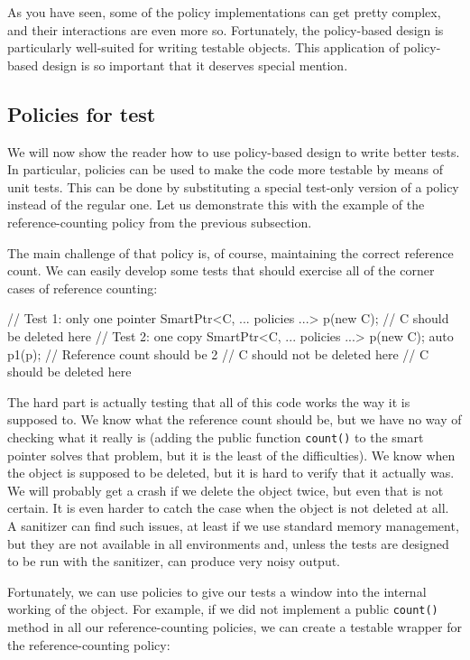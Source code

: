 As you have seen, some of the policy implementations can get pretty complex, and their interactions are even more so. Fortunately, the policy-based design is particularly well-suited for writing testable objects. This application of policy-based design is so important that it deserves special mention.

\subsection{Policies for test}

We will now show the reader how to use policy-based design to write better tests. In particular, policies can be used to make the code more testable by means of unit tests. This can be done by substituting a special test-only version of a policy instead of the regular one. Let us demonstrate this with the example of the reference-counting policy from the previous subsection.

The main challenge of that policy is, of course, maintaining the correct reference count. We can easily develop some tests that should exercise all of the corner cases of reference counting:

\begin{code}
// Test 1: only one pointer
{
  SmartPtr<C, ... policies ...> p(new C);
} // C should be deleted here
// Test 2: one copy
{
  SmartPtr<C, ... policies ...> p(new C);
  {
    auto p1(p); // Reference count should be 2
  } // C should not be deleted here
} // C should be deleted here
\end{code}

The hard part is actually testing that all of this code works the way it is supposed to. We know what the reference count should be, but we have no way of checking what it really is (adding the public function \texttt{count()} to the smart pointer solves that problem, but it is the least of the difficulties). We know when the object is supposed to be deleted, but it is hard to verify that it actually was. We will probably get a crash if we delete the object twice, but even that is not certain. It is even harder to catch the case when the object is not deleted at all. A sanitizer can find such issues, at least if we use standard memory management, but they are not available in all environments and, unless the tests are designed to be run with the sanitizer, can produce very noisy output.

Fortunately, we can use policies to give our tests a window into the internal working of the object. For example, if we did not implement a public \texttt{count()} method in all our reference-counting policies, we can create a testable wrapper for the reference-counting policy:

